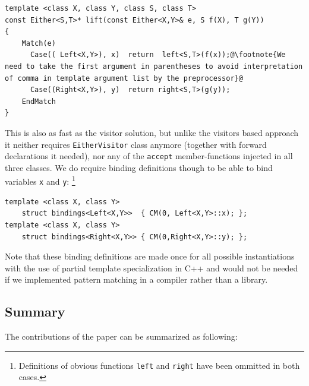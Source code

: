 \documentclass[preprint]{sigplanconf}
\makeatletter
\DeclareRobustCommand{\code}[1]{{\lstinline[breaklines=false,escapechar=@]{#1}}}
\makeatother
\begin{document}
\begin{lstlisting}[keepspaces,columns=flexible]
template <class X, class Y, class S, class T>
const Either<S,T>* lift(const Either<X,Y>& e, S f(X), T g(Y))
{
    Match(e)
      Case(( Left<X,Y>), x)  return  left<S,T>(f(x));@\footnote{We need to take the first argument in parentheses to avoid interpretation of comma in template argument list by the preprocessor}@
      Case((Right<X,Y>), y)  return right<S,T>(g(y));
    EndMatch
}
\end{lstlisting}

This is also as fast as the visitor solution, but unlike the visitors based 
approach it neither requires \code{EitherVisitor} class anymore (together with 
forward declarations it needed), nor any of the \code{accept} member-functions 
injected in all three classes. We do require binding definitions though to be 
able to bind variables \code{x} and \code{y}:
\footnote{Definitions of obvious functions \code{left} and \code{right} have 
been ommitted in both cases.}

\begin{lstlisting}[keepspaces,columns=flexible]
template <class X, class Y> 
    struct bindings<Left<X,Y>>  { CM(0, Left<X,Y>::x); };
template <class X, class Y> 
    struct bindings<Right<X,Y>> { CM(0,Right<X,Y>::y); };
\end{lstlisting}

Note that these binding definitions are made once for all possible instantiations 
with the use of partial template specialization in C++ and would not be needed 
if we implemented pattern matching in a compiler rather than a library.

\subsection{Summary}

The contributions of the paper can be summarized as following:
\end{document}

